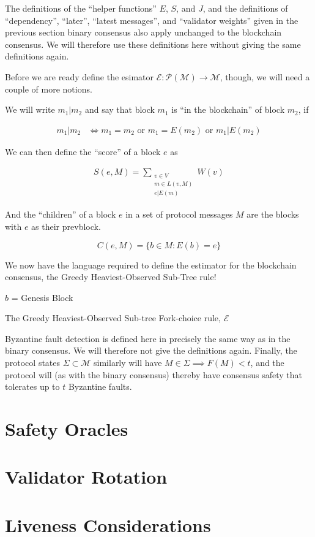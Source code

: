 \documentclass{article}
\theoremstyle{definition}
\begin{document}
The definitions of the ``helper functions'' $E$, $S$, and $J$, and the definitions of ``dependency'', ``later'', ``latest messages'', and ``validator weights'' given in the previous section binary consensus also apply unchanged to the blockchain consensus. We will therefore use these definitions here without giving the same definitions again. 

Before we are ready define the esimator $\mathcal{E}: \mathcal{P}(\mathcal{M}) \to \mathcal{M}$, though, we will need a couple of more notions.

We will write $m_1 | m_2$ and say that block $m_1$ is ``in the blockchain'' of block $m_2$, if 

\begin{align}
	m_1 | m_2 &\iff m_1 = m_2 \text{ or } m_1 = E(m_2) \text{ or } m_1 | E(m_2) 
\end{align}

We can then define the ``score'' of a block $e$ as

\begin{align}
S(e, M) = \sum_{\substack{v \in V \\ m \in L(v,M) \\ e|E(m)}} W(v)
\end{align}

And the ``children'' of a block $e$ in a set of protocol messages $M$ are the blocks with $e$ as their prevblock.

$$
C(e,M) = \{b \in M : E(b) = e\}
$$

We now have the language required to define the estimator for the blockchain consensus, the Greedy Heaviest-Observed Sub-Tree rule!

\begin{algorithm}[H]
 $b$ = Genesis Block


\caption{The Greedy Heaviest-Observed Sub-tree Fork-choice rule, $\mathcal{E}$}
\end{algorithm}

Byzantine fault detection is defined here in precisely the same way as in the binary consensus. We will therefore not give the definitions again. Finally, the protocol states $\Sigma \subset \mathcal{M}$ similarly will have $M \in \Sigma \implies F(M) < t$, and the protocol will (as with the binary consensus) thereby have consensus safety that tolerates up to $t$ Byzantine faults.


\section{Safety Oracles}
\section{Validator Rotation}
\section{Liveness Considerations}
\end{document}
